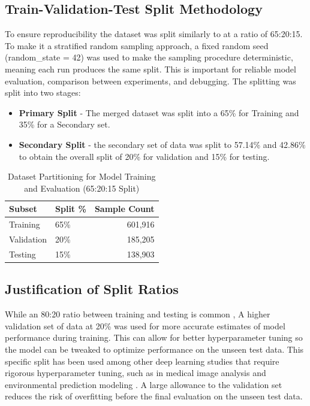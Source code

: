 \subsection{Train-Validation-Test Split Methodology}
To ensure reproducibility the dataset was split similarly to \citep{Nunes2019, Lorenz2019} at a ratio of 65:20:15. To make it a stratified random sampling approach, a fixed random seed (random\_state = 42) was used to make the sampling procedure deterministic, meaning each run produces the same split. This is important for reliable model evaluation, comparison between experiments, and debugging.
The splitting was split into two stages:
\begin{itemize}
    \item \textbf{Primary Split} - The merged dataset was split into a 65\% for Training and 35\% for a Secondary set.
    \item \textbf{Secondary Split} - the secondary set of data was split to 57.14\% and 42.86\% to obtain the overall split of 20\% for validation and 15\% for testing.
\end{itemize}
\begin{table}[H]
\setlength{\tabcolsep}{30pt}
\centering
\caption{Dataset Partitioning for Model Training and Evaluation (65:20:15 Split)}
\label{tab:data_split}
\begin{tabular}{l l r}
    \toprule
    \textbf{Subset} & \textbf{Split \%} & \textbf{Sample Count} \\
    \midrule
    Training & 65\% & 601,916 \\
    Validation & 20\% & 185,205 \\
    Testing & 15\% & 138,903 \\
    \bottomrule
\end{tabular}
\end{table}
\subsection{Justification of Split Ratios}
While an 80:20 ratio between training and testing is common \citep{Talukder2025, Zhan2025}, A higher validation set of data at 20\% was used for more accurate estimates of model performance during training. This can allow for better hyperparameter tuning so the model can be tweaked to optimize performance on the unseen test data. This specific split has been used among other deep learning studies that require rigorous hyperparameter tuning, such as in medical image analysis \citep{Nunes2019} and environmental prediction modeling \citep{Lorenz2019}. A large allowance to the validation set reduces the risk of overfitting before the final evaluation on the unseen test data.








